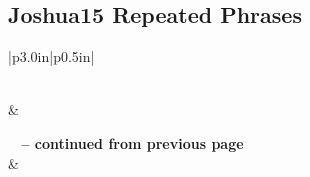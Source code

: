 \subsection{Joshua15 Repeated Phrases}


\normalsize
 
\begin{center}
\begin{longtable}{|p{3.0in}|p{0.5in}|}
\caption[Joshua 15 Repeated Phrases]{Joshua 15 Repeated Phrases}\label{table:Repeated Phrases Joshua 15} \\
\hline {} &  \\ \hline 
\endfirsthead
 
{{\bfseries \tablename\ \thetable{} -- continued from previous page}} \\  
\hline {} &  \\ \hline 
\endhead
 

\end{longtable}
\end{center}
